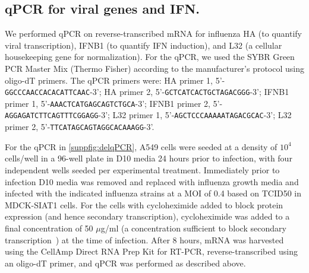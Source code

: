 \documentclass[lineno]{asm-article}
\newcommand{\SUPPFIG}[1]{\autoref{suppfig:#1}}
\begin{document}
\subsection{qPCR for viral genes and IFN.}
We performed qPCR on reverse-transcribed mRNA for influenza HA (to quantify viral transcription), IFNB1 (to quantify IFN induction), and L32 (a cellular housekeeping gene for normalization).
For the qPCR, we used the SYBR Green PCR Master Mix (Thermo Fisher) according to the manufacturer's protocol using oligo-dT primers.
The qPCR primers were: HA primer 1, 5'-\texttt{GGCCCAACCACACATTCAAC}-3'; HA primer 2, 5'-\texttt{GCTCATCACTGCTAGACGGG}-3'; IFNB1 primer 1, 5'-\texttt{AAACTCATGAGCAGTCTGCA}-3'; IFNB1 primer 2, 5'-\texttt{AGGAGATCTTCAGTTTCGGAGG}-3'; L32 primer 1, 5'-\texttt{AGCTCCCAAAAATAGACGCAC}-3'; L32 primer 2, 5'-\texttt{TTCATAGCAGTAGGCACAAAGG}-3'. 

For the qPCR in \SUPPFIG{delqPCR}, A549 cells were seeded at a density of $10^4$ cells/well in a 96-well plate in D10 media 24 hours prior to infection, with four independent wells seeded per experimental treatment. 
Immediately prior to infection D10 media was removed and replaced with influenza growth media and infected with the indicated influenza strains at a MOI of 0.4 based on TCID50 in MDCK-SIAT1 cells.
For the cells with cycloheximide added to block protein expression (and hence secondary transcription), cycloheximide was added to a final concentration of 50 $\mu$g/ml (a concentration sufficient to block secondary transcription~\cite{killip2014activation}) at the time of infection.
After 8 hours, mRNA was harvested using the CellAmp Direct RNA Prep Kit for RT-PCR, reverse-transcribed using an oligo-dT primer, and qPCR was performed as described above.
\end{document}
